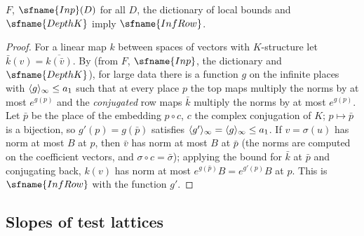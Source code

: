 \begin{theorem}\label{pf:fit:opposite}
$F$, $\sfname{Inp}(D)$ for all $D$, the dictionary of local bounds and $\sfname{DepthK}$ imply $\sfname{InfRow}$.
\end{theorem}

\begin{proof}
For a linear map $k$ between spaces of vectors with $K$-structure let $\bar k(v)=\overline{k(\bar v)}$. By
 (from $F$, $\sfname{Inp}$, the dictionary and $\sfname{DepthK}$), for large
data there is a function $g$ on the infinite places with $\langle g\rangle_{\infty}\le a_1$ such that at every place $p$
the top maps multiply the norms by at most $e^{g(p)}$ and the \emph{conjugated} row maps $\bar k$ multiply the norms by at most
$e^{g(p)}$. Let $\bar p$ be the place of the embedding $p\circ c$, $c$ the complex conjugation of $K$; $p\mapsto\bar p$ is a
bijection, so $g'(p)=g(\bar p)$ satisfies $\langle g'\rangle_{\infty}=\langle g\rangle_{\infty}\le a_1$. If $v=\sigma(u)$ has norm at most $B$ at $p$, then $\bar v$
has norm at most $B$ at $\bar p$ (the norms are computed on the coefficient vectors, and $\sigma\circ c=\bar\sigma$); applying the
bound for $\bar k$ at $\bar p$ and conjugating back, $k(v)$ has norm at most $e^{g(\bar p)}B=e^{g'(p)}B$ at $p$. This is
$\sfname{InfRow}$ with the function $g'$.
\end{proof}

\subsection{Slopes of test lattices}\label{sec:pf:fit:testlat}

